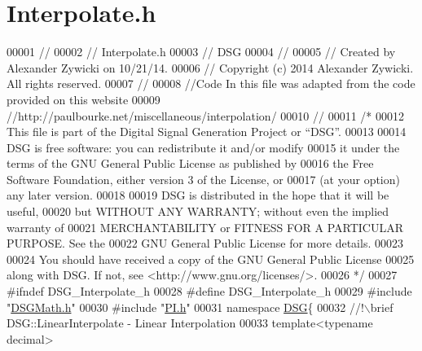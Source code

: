 \hypertarget{_interpolate_8h_source}{\section{Interpolate.\+h}
\label{_interpolate_8h_source}
}

\begin{DoxyCode}
00001 \textcolor{comment}{//}
00002 \textcolor{comment}{//  Interpolate.h}
00003 \textcolor{comment}{//  DSG}
00004 \textcolor{comment}{//}
00005 \textcolor{comment}{//  Created by Alexander Zywicki on 10/21/14.}
00006 \textcolor{comment}{//  Copyright (c) 2014 Alexander Zywicki. All rights reserved.}
00007 \textcolor{comment}{//}
00008 \textcolor{comment}{//Code In this file was adapted from the code provided on this website}
00009 \textcolor{comment}{//http://paulbourke.net/miscellaneous/interpolation/}
00010 \textcolor{comment}{//}
00011 \textcolor{comment}{/*}
00012 \textcolor{comment}{ This file is part of the Digital Signal Generation Project or “DSG”.}
00013 \textcolor{comment}{}
00014 \textcolor{comment}{ DSG is free software: you can redistribute it and/or modify}
00015 \textcolor{comment}{ it under the terms of the GNU General Public License as published by}
00016 \textcolor{comment}{ the Free Software Foundation, either version 3 of the License, or}
00017 \textcolor{comment}{ (at your option) any later version.}
00018 \textcolor{comment}{}
00019 \textcolor{comment}{ DSG is distributed in the hope that it will be useful,}
00020 \textcolor{comment}{ but WITHOUT ANY WARRANTY; without even the implied warranty of}
00021 \textcolor{comment}{ MERCHANTABILITY or FITNESS FOR A PARTICULAR PURPOSE.  See the}
00022 \textcolor{comment}{ GNU General Public License for more details.}
00023 \textcolor{comment}{}
00024 \textcolor{comment}{ You should have received a copy of the GNU General Public License}
00025 \textcolor{comment}{ along with DSG.  If not, see <http://www.gnu.org/licenses/>.}
00026 \textcolor{comment}{ */}
00027 \textcolor{preprocessor}{#ifndef DSG\_Interpolate\_h}
00028 \textcolor{preprocessor}{#define DSG\_Interpolate\_h}
00029 \textcolor{preprocessor}{#include "\hyperlink{_d_s_g_math_8h}{DSGMath.h}"}
00030 \textcolor{preprocessor}{#include "\hyperlink{_p_i_8h}{PI.h}"}
00031 \textcolor{keyword}{namespace }\hyperlink{namespace_d_s_g}{DSG}\{\textcolor{comment}{}
00032 \textcolor{comment}{    //!\(\backslash\)brief DSG::LinearInterpolate - Linear Interpolation}
00033 \textcolor{comment}{}    \textcolor{keyword}{template}<\textcolor{keyword}{typename} decimal>

\end{DoxyCode}
